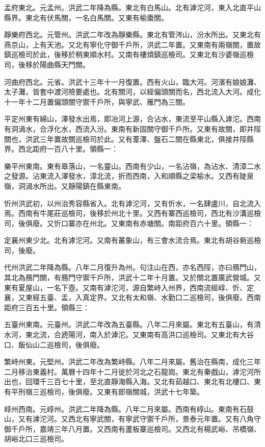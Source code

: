 孟府東北。元孟州。洪武二年降為縣。東北有白馬山。北有滹沱河，東入北直平山縣界。東北有伏馬關，一名白馬關。又東有榆棗關。

靜樂府西北。元管州。洪武二年改為靜樂縣。東北有管涔山，汾水所出。又東北有燕京山，上有天池。又北有寧化守御千戶所，洪武二年置。又東南有兩嶺關，置故鎮巡檢司於此，後移於稍東順水村。又南有樓煩鎮巡檢司。又東北有沙婆嶺巡檢司，後移於陽曲縣天門關。

河曲府西北。元省。洪武十三年十一月復置。西有火山，臨大河。河濱有娘娘灘、太子灘，皆套中渡河險要處也。北有關河，以經偏頭關而名，西北流入大河。成化十一年十二月置偏頭關守禦千戶所，與寧武、雁門為三關。

平定州東有綿山，澤發水出焉，即冶河上源，合沾水，東流至平山縣入滹沱。西南有洞渦水，合浮化水，西流入汾。東南有新固關守御千戶所。又東有故關，即井陘關也，洪武三年置故關巡檢司於此。又有葦澤、盤石二關在縣東北，俱接井陘縣界。西北距府一百八十里。領縣一：

樂平州東南。東有皋落山，一名靈山。西南有少山，一名沾嶺，為沾水、清漳二水之發源。沾東流入澤發水，漳北流，折而西南，入和順縣之梁榆水。又西有陡泉嶺，洞渦水所出。又靜陽鎮在縣東南。

忻州洪武初，以州治秀容縣省入。北有滹沱河，又有忻水，一名肆盧川，自北流入焉。西南有牛尾莊巡檢司，後移於州北十里。又西有寨西巡檢司，西北有沙溝巡檢司，後俱廢。又忻口寨亦在州北。又東南有赤塘關。南距府百六十里。領縣一：

定襄州東少北。北有滹沱河。又南有叢象山，有三會水流合焉。東北有胡谷砦巡檢司，後廢。

代州洪武二年降為縣。八年二月復升為州。句注山在西，亦名西陘，亦曰鴈門山，其北為鴈門關，有鴈門守禦千戶所，洪武十二年十月置。又於關北置廣武營城。又東有夏屋山，一名下壺。又南有滹沱河，源自繁峙入州界，西南流經崞、忻、定襄，又東經五臺、盂，入真定界。又北有太和嶺、水勤口二巡檢司，後俱廢。西南距府三百五十里。領縣三：

五臺州東南。元臺州。洪武二年改為五臺縣。八年二月來屬。東北有五臺山，有清水河，東北流，合虒陽河，南入於滹沱。又東南有高洪口巡檢司。又東北有大谷口、飯仙山二巡檢司，後俱廢。

繁峙州東。元堅州。洪武二年改為繁峙縣。八年二月來屬。舊治在縣南，成化三年二月移治東義村。萬曆十四年十二月徙於河北之石龍崗。東北有秦戲山，滹沱河所出也，回環千三百七十里，至北直靜海縣入海。又北有茹越口、東北有北樓口、東有平刑嶺三巡檢司，後俱廢。又東有郎嶺關城，洪武十七年築。

崞州西南。元崞州。洪武二年降為縣。八年二月來屬。西南有崞山。東南有石鼓山，又有滹沱河。又西北有寧武關，有寧武守禦千戶所，景泰元年置。又有八角守御千戶所，嘉靖三年八月置。又西南有蘆板寨巡檢司。又西北有楊武峪、吊橋嶺、胡峪北口三巡檢司。

